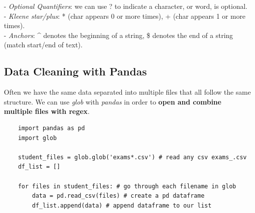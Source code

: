 \documentclass[11pt, a4paper]{article}
\begin{document}
\begin{spacing}{1.1}
	\noindent \hspace*{3mm} - \textit{Optional Quantifiers}: we can use ? to indicate a character, or word, is optional. \\
	\hspace*{3mm} - \textit{Kleene star/plus}: * (char appears 0 or more times), + (char appears 1 or more times). \\
	\hspace*{3mm} - \textit{Anchors}: \^{} denotes the beginning of a string, \$ denotes the end of a string (match start/end of text). \\	
	\subsection{Data Cleaning with Pandas}
	Often we have the same data separated into multiple files that all follow the same structure. We can use \textit{glob} with \textit{pandas} in order to \textbf{open and combine multiple files with regex}. 
	\begin{lstlisting}
	import pandas as pd
	import glob
	
	student_files = glob.glob('exams*.csv') # read any csv exams_.csv
	df_list = [] 
	
	for files in student_files: # go through each filename in glob 
		data = pd.read_csv(files) # create a pd dataframe
		df_list.append(data) # append dataframe to our list
	

\end{lstlisting}
\end{spacing}
\end{document}
